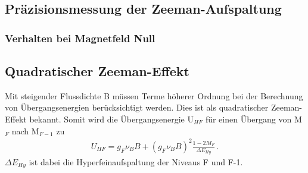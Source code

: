 \documentclass[]{scrartcl}
\begin{document}
\subsection{Präzisionsmessung der Zeeman-Aufspaltung}

\subsubsection{Verhalten bei Magnetfeld Null}

\subsection{Quadratischer Zeeman-Effekt}
Mit steigender Flussdichte B müssen Terme höherer Ordnung bei der Berechnung von Übergangsenergien berücksichtigt werden. Dies ist als quadratischer Zeeman-Effekt bekannt. Somit wird die Übergangsenergie U$_{HF}$ für einen Übergang von M$_F$ nach M$_{F-1}$ zu
\begin{align}
U_{HF}=g_F\nu_B B+\left( g_F\nu_B B\right)^2\frac{1-2M_F}{\Delta E_{Hy}}\,.
\label{eq:quadratzeeman}
\end{align}
$\Delta E_{Hy}$ ist dabei die Hyperfeinaufspaltung der Niveaus F und F-1.
\end{document}
